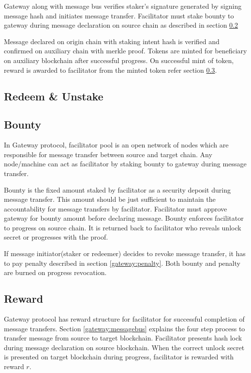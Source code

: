\documentclass[12pt,a4paper]{article}
\begin{document}
Gateway along with message bus verifies staker’s signature generated by signing message hash and initiates message transfer.
Facilitator must stake bounty to gateway during message declaration on source chain as described in section \ref{gateway:bounty} 

Message declared on origin chain with staking intent hash is verified and confirmed on auxiliary chain with merkle proof. 
Tokens are minted for beneficiary on auxiliary blockchain after successful progress. 
On successful mint of token, reward is awarded to facilitator from the minted token refer section \ref{gateway:reward}.

\subsection{Redeem \& Unstake}\label{gateway:redeemunstake}
\subsection{Bounty}\label{gateway:bounty}
 In Gateway protocol, facilitator pool is an open network of nodes which are responsible for message transfer between source and target chain. 
 Any node/machine can act as facilitator by staking bounty to gateway during message transfer. 

Bounty is the fixed amount staked by facilitator as a security deposit during message transfer.
This amount should be just sufficient to maintain the accountability for message transfers by facilitator. 
Facilitator must approve gateway for bounty amount before declaring message. 
Bounty enforces facilitator to progress on source chain. 
It is returned back to facilitator who reveals unlock secret or progresses with the proof.

If message initiator(staker or redeemer) decides to revoke message transfer, it has to pay penalty described in section \ref{gateway:penalty}. 
Both bounty and penalty are burned on progress revocation. 

\subsection{Reward}\label{gateway:reward}
Gateway protocol has reward structure for facilitator for successful completion of message transfers. 
Section \ref{gateway:messagebus} explains the four step process to transfer message from source to target blockchain. 
Facilitator presents hash lock during message declaration on source blockchain. 
When the correct unlock secret is presented on target blockchain during progress, facilitator is rewarded with reward $r$. 
\end{document}
